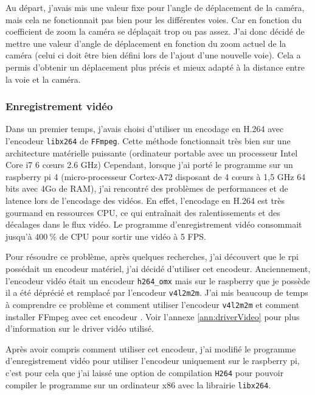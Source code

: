 \documentclass[a4paper, 11pt, french]{article}
\begin{document}
Au départ, j'avais mis une valeur fixe pour l'angle de déplacement de la caméra, mais cela ne fonctionnait pas bien pour les différentes voies. Car en fonction du coefficient de zoom la caméra se déplaçait trop ou pas assez. J'ai donc décidé de mettre une valeur d'angle de déplacement en fonction du zoom actuel de la caméra (celui ci doit être bien défini lors de l'ajout d'une nouvelle voie). Cela a permis d'obtenir un déplacement plus précis et mieux adapté à la distance entre la voie et la caméra.


\subsubsection{Enregistrement vidéo}

Dans un premier temps, j'avais choisi d'utiliser un encodage en H.264 avec l'encodeur \texttt{libx264} de \texttt{FFmpeg}. Cette méthode fonctionnait très bien sur une architecture matérielle puissante (ordinateur portable avec un processeur Intel Core i7 6 c\oe urs  2.6 GHz) Cependant, lorsque j'ai porté le programme sur un raspberry pi 4 (micro-processeur Cortex-A72 disposant de 4 c\oe urs à 1,5 GHz 64 bits avec 4Go de RAM), j'ai rencontré des problèmes de performances et de latence lors de l'encodage des vidéos. En effet, l'encodage en H.264 est très gourmand en ressources CPU, ce qui entraînait des ralentissements et des décalages dans le flux vidéo. Le programme d'enregistrement vidéo consommait jusqu'à \(400\ \%\) de CPU pour sortir une vidéo à 5 FPS.

Pour résoudre ce problème, après quelques recherches, j'ai découvert que le rpi possédait un encodeur matériel, j'ai décidé d'utiliser cet encodeur. Anciennement, l'encodeur vidéo était un encodeur \texttt{h264\_omx} mais sur le raspberry que je possède il a été déprécié et remplacé  par l'encodeur \texttt{v4l2m2m}\cite{v4l2}. J'ai mis beaucoup de temps à comprendre ce problème et comment utiliser l'encodeur \texttt{v4l2m2m} et comment installer FFmpeg avec cet encodeur \cite{manFFmpegV4l2}. Voir l'annexe \ref{ann:driverVideo} pour plus d'information sur le driver vidéo utilisé.

Après avoir compris comment utiliser cet encodeur, j'ai modifié le programme d'enregistrement vidéo pour utiliser l'encodeur uniquement sur le raspberry pi, c'est pour cela que j'ai laissé une option de compilation \texttt{H264} pour pouvoir compiler le programme sur un ordinateur x86 avec la librairie \texttt{libx264}.
\end{document}
